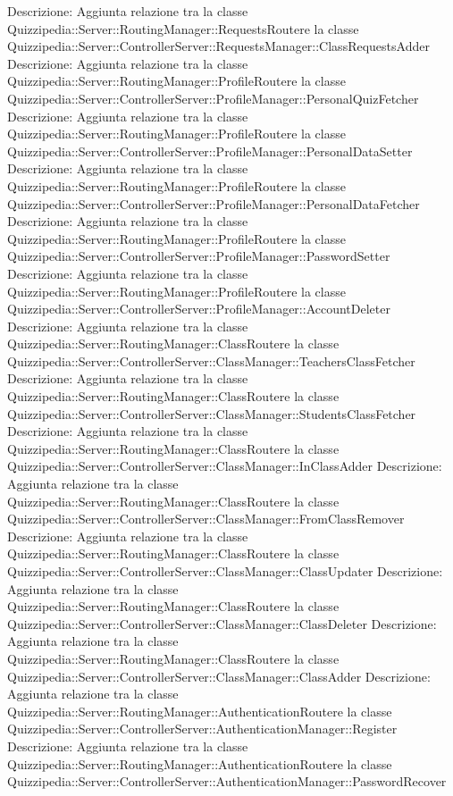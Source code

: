 Descrizione: Aggiunta relazione tra la classe Quizzipedia::Server::RoutingManager::RequestsRoutere la classe Quizzipedia::Server::ControllerServer::RequestsManager::ClassRequestsAdder 
Descrizione: Aggiunta relazione tra la classe Quizzipedia::Server::RoutingManager::ProfileRoutere la classe Quizzipedia::Server::ControllerServer::ProfileManager::PersonalQuizFetcher 
Descrizione: Aggiunta relazione tra la classe Quizzipedia::Server::RoutingManager::ProfileRoutere la classe Quizzipedia::Server::ControllerServer::ProfileManager::PersonalDataSetter 
Descrizione: Aggiunta relazione tra la classe Quizzipedia::Server::RoutingManager::ProfileRoutere la classe Quizzipedia::Server::ControllerServer::ProfileManager::PersonalDataFetcher 
Descrizione: Aggiunta relazione tra la classe Quizzipedia::Server::RoutingManager::ProfileRoutere la classe Quizzipedia::Server::ControllerServer::ProfileManager::PasswordSetter 
Descrizione: Aggiunta relazione tra la classe Quizzipedia::Server::RoutingManager::ProfileRoutere la classe Quizzipedia::Server::ControllerServer::ProfileManager::AccountDeleter 
Descrizione: Aggiunta relazione tra la classe Quizzipedia::Server::RoutingManager::ClassRoutere la classe Quizzipedia::Server::ControllerServer::ClassManager::TeachersClassFetcher 
Descrizione: Aggiunta relazione tra la classe Quizzipedia::Server::RoutingManager::ClassRoutere la classe Quizzipedia::Server::ControllerServer::ClassManager::StudentsClassFetcher 
Descrizione: Aggiunta relazione tra la classe Quizzipedia::Server::RoutingManager::ClassRoutere la classe Quizzipedia::Server::ControllerServer::ClassManager::InClassAdder 
Descrizione: Aggiunta relazione tra la classe Quizzipedia::Server::RoutingManager::ClassRoutere la classe Quizzipedia::Server::ControllerServer::ClassManager::FromClassRemover 
Descrizione: Aggiunta relazione tra la classe Quizzipedia::Server::RoutingManager::ClassRoutere la classe Quizzipedia::Server::ControllerServer::ClassManager::ClassUpdater 
Descrizione: Aggiunta relazione tra la classe Quizzipedia::Server::RoutingManager::ClassRoutere la classe Quizzipedia::Server::ControllerServer::ClassManager::ClassDeleter 
Descrizione: Aggiunta relazione tra la classe Quizzipedia::Server::RoutingManager::ClassRoutere la classe Quizzipedia::Server::ControllerServer::ClassManager::ClassAdder 
Descrizione: Aggiunta relazione tra la classe Quizzipedia::Server::RoutingManager::AuthenticationRoutere la classe Quizzipedia::Server::ControllerServer::AuthenticationManager::Register 
Descrizione: Aggiunta relazione tra la classe Quizzipedia::Server::RoutingManager::AuthenticationRoutere la classe Quizzipedia::Server::ControllerServer::AuthenticationManager::PasswordRecover 
